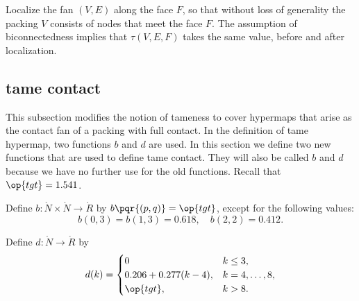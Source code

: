 \begin{remark}\label{rem:local-same} %
  Localize the fan $(V,E)$ along the face $F$, so that without loss of generality
   the packing $V$ consists of
  nodes that meet the face $F$.  
The assumption of biconnectedness
 implies that $\tau(V,E,F)$ takes the same value, before and after localization.
\end{remark}






\subsection{tame contact}

This subsection modifies the notion of tameness to cover hypermaps that arise as
the contact fan of a packing with full contact.  In the definition of tame hypermap, two functions
$b$ and $d$ are used.  In this section we define two new functions that are used to define
tame contact.  They will also be called $b$ and $d$ because
we have no further use for the old functions.  Recall that $\op{tgt}=1.541$.
%
%

\begin{definition}[b]
  Define $b:\ring{N}\times \ring{N}\to \ring{R}$ by
  $b\pqr{(p,q)}=\op{tgt}$, except for the following values:
\begin{displaymath}
b(0,3)=b(1,3)=0.618,\quad b(2,2)=0.412.
\end{displaymath}
\end{definition}
%

\begin{definition}[d]
Define $d:\ring{N}\to \ring{R}$ by
\begin{displaymath}d(k) = \begin{cases}
0 & k\le 3, \\
0.206 + 0.277 (k-4),& k=4,\ldots,8,\\
\op{tgt},& k>8.\\
\end{cases}
\end{displaymath}
\end{definition}
%

